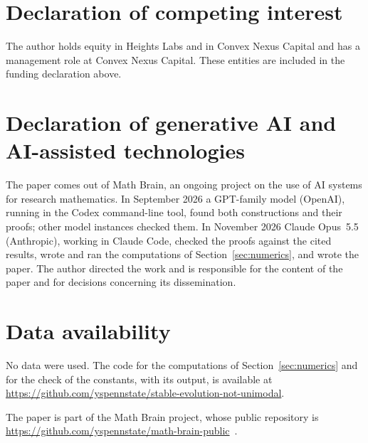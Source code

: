 \documentclass[11pt]{amsart}
\theoremstyle{definition}
\theoremstyle{remark}
\numberwithin{equation}{section}
\begin{document}
\section*{Declaration of competing interest}
The author holds equity in Heights Labs and in Convex Nexus Capital and
has a management role at Convex Nexus Capital. These entities are included
in the funding declaration above.

\section*{Declaration of generative AI and AI-assisted technologies}
The paper comes out of Math Brain, an ongoing project on the use of AI systems for research mathematics. In September 2026 a GPT-family model (OpenAI), running in the Codex command-line tool, found both constructions and their proofs; other model instances checked them. In November 2026 Claude Opus~5.5 (Anthropic), working in Claude Code, checked the proofs against the cited results, wrote and ran the computations of Section~\ref{sec:numerics}, and wrote the paper. The author directed the work and is responsible for the content of the paper and for decisions concerning its dissemination.

\section*{Data availability}
No data were used. The code for the computations of Section~\ref{sec:numerics} and for the check of the constants, with its output, is available at\\ \url{https://github.com/yspennstate/stable-evolution-not-unimodal}.

The paper is part of the Math Brain project, whose public repository is \url{https://github.com/yspennstate/math-brain-public}~\cite{MathBrainRepo}.
\end{document}
